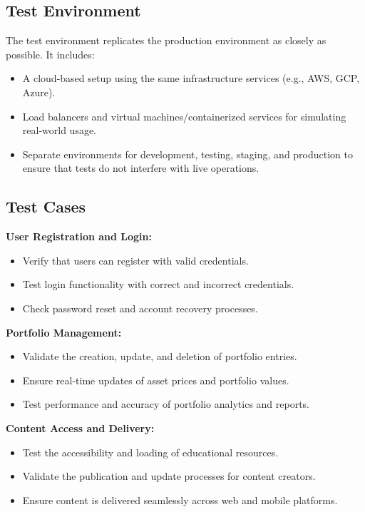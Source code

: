 \documentclass[12pt]{report}
\begin{document}
\subsection{Test Environment}

The test environment replicates the production environment as closely as possible. It includes:
\begin{itemize}
    \item A cloud-based setup using the same infrastructure services (e.g., AWS, GCP, Azure).
    \item Load balancers and virtual machines/containerized services for simulating real-world usage.
    \item Separate environments for development, testing, staging, and production to ensure that tests do not interfere with live operations.
\end{itemize}

\subsection{Test Cases}

\textbf{User Registration and Login:}
\begin{itemize}
    \item Verify that users can register with valid credentials.
    \item Test login functionality with correct and incorrect credentials.
    \item Check password reset and account recovery processes.
\end{itemize}

\textbf{Portfolio Management:}
\begin{itemize}
    \item Validate the creation, update, and deletion of portfolio entries.
    \item Ensure real-time updates of asset prices and portfolio values.
    \item Test performance and accuracy of portfolio analytics and reports.
\end{itemize}

\textbf{Content Access and Delivery:}
\begin{itemize}
    \item Test the accessibility and loading of educational resources.
    \item Validate the publication and update processes for content creators.
    \item Ensure content is delivered seamlessly across web and mobile platforms.
\end{itemize}
\end{document}
